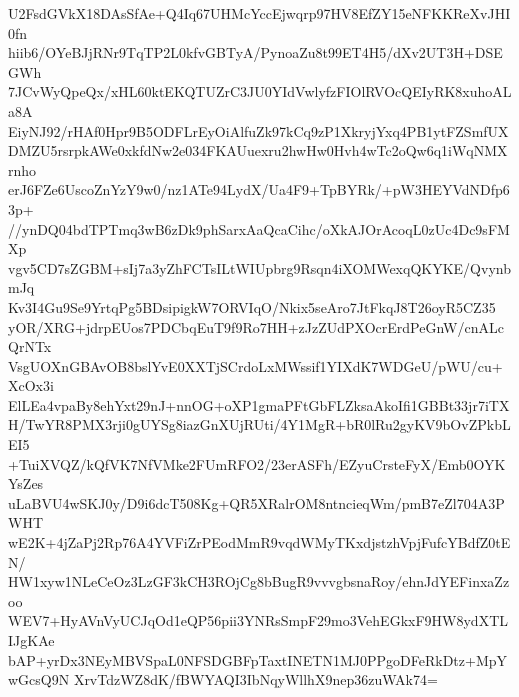 U2FsdGVkX18DAsSfAe+Q4Iq67UHMcYccEjwqrp97HV8EfZY15eNFKKReXvJHI0fn
hiib6/OYeBJjRNr9TqTP2L0kfvGBTyA/PynoaZu8t99ET4H5/dXv2UT3H+DSEGWh
7JCvWyQpeQx/xHL60ktEKQTUZrC3JU0YIdVwlyfzFIOlRVOcQEIyRK8xuhoALa8A
EiyNJ92/rHAf0Hpr9B5ODFLrEyOiAlfuZk97kCq9zP1XkryjYxq4PB1ytFZSmfUX
DMZU5rsrpkAWe0xkfdNw2e034FKAUuexru2hwHw0Hvh4wTc2oQw6q1iWqNMXrnho
erJ6FZe6UscoZnYzY9w0/nz1ATe94LydX/Ua4F9+TpBYRk/+pW3HEYVdNDfp63p+
//ynDQ04bdTPTmq3wB6zDk9phSarxAaQcaCihc/oXkAJOrAcoqL0zUc4Dc9sFMXp
vgv5CD7sZGBM+sIj7a3yZhFCTsILtWIUpbrg9Rsqn4iXOMWexqQKYKE/QvynbmJq
Kv3I4Gu9Se9YrtqPg5BDsipigkW7ORVIqO/Nkix5seAro7JtFkqJ8T26oyR5CZ35
yOR/XRG+jdrpEUos7PDCbqEuT9f9Ro7HH+zJzZUdPXOcrErdPeGnW/cnALcQrNTx
VsgUOXnGBAvOB8bslYvE0XXTjSCrdoLxMWssif1YIXdK7WDGeU/pWU/cu+XcOx3i
ElLEa4vpaBy8ehYxt29nJ+nnOG+oXP1gmaPFtGbFLZksaAkoIfi1GBBt33jr7iTX
H/TwYR8PMX3rji0gUYSg8iazGnXUjRUti/4Y1MgR+bR0lRu2gyKV9bOvZPkbLEI5
+TuiXVQZ/kQfVK7NfVMke2FUmRFO2/23erASFh/EZyuCrsteFyX/Emb0OYKYsZes
uLaBVU4wSKJ0y/D9i6dcT508Kg+QR5XRalrOM8ntncieqWm/pmB7eZl704A3PWHT
wE2K+4jZaPj2Rp76A4YVFiZrPEodMmR9vqdWMyTKxdjstzhVpjFufcYBdfZ0tEN/
HW1xyw1NLeCeOz3LzGF3kCH3ROjCg8bBugR9vvvgbsnaRoy/ehnJdYEFinxaZzoo
WEV7+HyAVnVyUCJqOd1eQP56pii3YNRsSmpF29mo3VehEGkxF9HW8ydXTLIJgKAe
bAP+yrDx3NEyMBVSpaL0NFSDGBFpTaxtINETN1MJ0PPgoDFeRkDtz+MpYwGcsQ9N
XrvTdzWZ8dK/fBWYAQI3IbNqyWllhX9nep36zuWAk74=
